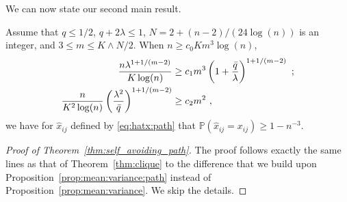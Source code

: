 \documentclass[final]{colt2026}
\newcommand{\1}{\mathbf{1}}
\newcommand{\bbP}{\mathbb{P}}
\newcommand{\pa}[1]{\left(#1\right)}
\begin{document}
We can now state our second main result.  
\begin{theorem}\label{thm:self_avoiding_path}
Assume that $q\leq 1/2$, $q+2\lambda \leq 1$,  $N=2+(n-2)/(24\log(n))$ is an integer, and $3\leq m\leq K\wedge N/2$. When $n \geq c_0 Km^3\log(n)$, 
\begin{align*}
{n \lambda^{1+ 1/(m-2)}\over  K \log(n)} & \geq c_1 m^3 \pa{1+{\bar q\over \lambda}}^{1+1/(m-2)} \ ; \\
{n \over K^2 \log(n) }\pa{\lambda^2\over \bar q}^{1+ 1/(m-2)} & \geq c_2 m^{2} \  , 
 \end{align*}
we have for $\hat x_{ij}$ defined by \eqref{eq:hatx:path} that $\bbP\pa{\hat x_{ij}=x_{ij}}\geq 1-n^{-3}$. 
\end{theorem}

\begin{proof}[Proof of Theorem~\ref{thm:self_avoiding_path}]
The proof follows exactly the same lines as that of Theorem~\ref{thm:clique} to the difference that we build upon Proposition~\ref{prop:mean:variance:path} instead of Proposition~\ref{prop:mean:variance}. We skip the details.
\end{proof}






\end{document}

